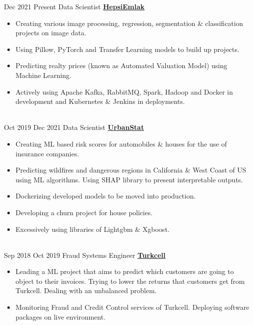 \documentclass[letterpaper]{DS_class_file} %
\begin{document}
\begin{twenty}
    \twentyitem
		{Dec 2021}
		{Present}
		{\hspace{0.3cm}Data Scientist}
		{\href{https://www.hepsiemlak.com/}{\textbf{HepsiEmlak}}}
		{}
		{\begin{itemize}
			\item Creating various image processing, regression, segmentation \& classification projects on image data.
			\item Using Pillow, PyTorch and Transfer Learning models to build up projects.
			\item Predicting realty prices (known as Automated Valuation Model) using Machine Learning.
			\item Actively using Apache Kafka, RabbitMQ, Spark, Hadoop and Docker in development and Kubernetes \& Jenkins in deployments.
		\end{itemize}}
		\\
	\twentyitem
		{Oct 2019}
		{Dec 2021}
		{\hspace{0.3cm}Data Scientist}
		{\href{https://www.urbanstat.com/}{\textbf{UrbanStat}}}
		{}
		{\begin{itemize}
			\item Creating ML based risk scores for automobiles \& houses for the use of insurance companies.
			\item Predicting wildfires and dangerous regions in California \& West Coast of US using ML algorithms. Using SHAP library to present interpretable outputs.
			\item Dockerizing developed models to be moved into production.
			\item Developing a churn project for house policies.
			\item Excessively using libraries of Lightgbm \& Xgboost.
		\end{itemize}}
		\\
	\twentyitem
		{Sep 2018}
		{Oct 2019}
		{\hspace{0.3cm}Fraud Systems Engineer}
		{\href{https://www.turkcell.com.tr/}{\textbf{Turkcell}}}
		{}
		{\begin{itemize}
			\item Leading a ML project that aims to predict which customers are going to object to their invoices. Trying to lower the returns that customers get from Turkcell. Dealing with an unbalanced problem.
			\item Monitoring Fraud and Credit Control services of Turkcell. Deploying software packages on live environment.
		\end{itemize}}

\end{twenty}
\end{document}
